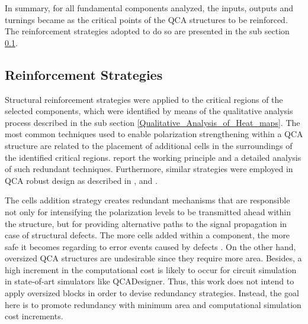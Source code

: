 In summary, for all fundamental components analyzed, the inputs, outputs and turnings became as the critical points of the QCA structures to be reinforced. The reinforcement strategies adopted to do so are presented in the sub section \ref{Reinforcement_Strategies}.

\subsection{Reinforcement Strategies}
\label{Reinforcement_Strategies}

Structural reinforcement strategies were applied to the critical regions of the selected components, which were identified by means of the qualitative analysis process described in the sub section \ref{Qualitative_Analysis_of_Heat_maps}. The most common techniques used to enable polarization strengthening within a QCA structure are related to the placement of additional cells in the surroundings of the identified critical regions.  report the working principle and a detailed analysis of such redundant techniques. Furthermore, similar strategies were employed in QCA robust design as described in ,  and .

The cells addition strategy creates redundant mechanisms that are responsible not only for intensifying the polarization levels to be transmitted ahead within the structure, but for providing alternative paths to the signal propagation in case of structural defects. The more cells added within a component, the more safe it becomes regarding to error events caused by defects \cite{timothy09}. On the other hand, oversized QCA structures are undesirable since they require more area. Besides, a high increment in the computational cost is likely to occur for circuit simulation in state-of-art simulators like QCADesigner. Thus, this work does not intend to apply oversized blocks in order to devise redundancy strategies. Instead, the goal here is to promote redundancy with minimum area and computational simulation cost increments.

